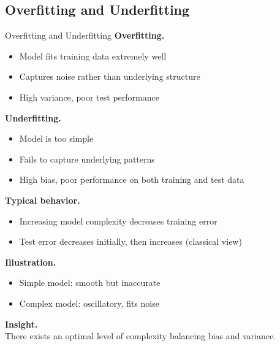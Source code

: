 \documentclass[aspectratio=169,11pt]{beamer}
\begin{document}
\subsection{Overfitting and Underfitting}
\begin{frame}[t,allowframebreaks]{Overfitting and Underfitting}
\small
\textbf{Overfitting.}\\ \begin{itemize}
    \item Model fits training data extremely well
    \item Captures noise rather than underlying structure
    \item High variance, poor test performance
\end{itemize}

\textbf{Underfitting.}\\ \begin{itemize}
    \item Model is too simple
    \item Fails to capture underlying patterns
    \item High bias, poor performance on both training and test data
\end{itemize}

\textbf{Typical behavior.}\\ \begin{itemize}
    \item Increasing model complexity decreases training error
    \item Test error decreases initially, then increases (classical view)
\end{itemize}

\textbf{Illustration.}\\ \begin{itemize}
    \item Simple model: smooth but inaccurate
    \item Complex model: oscillatory, fits noise
\end{itemize}

\textbf{Insight.}\\ There exists an optimal level of complexity balancing bias and variance.
\end{frame}
\end{document}
